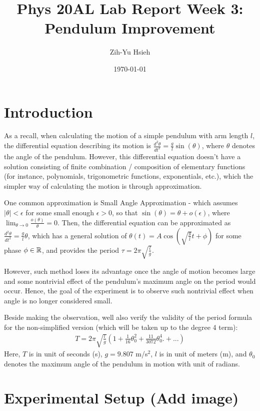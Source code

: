 \documentclass{article}
\title{Phys 20AL Lab Report Week 3: Pendulum Improvement}
\author{Zih-Yu Hsieh}
\date{\today}
\begin{document}
\maketitle

\tableofcontents

\newpage

\section{Introduction}
As a recall, when calculating the motion of a simple pendulum with arm length $l$, the differential equation describing its motion is $\frac{d^2\theta}{dt^2}=\frac{g}{l}\sin(\theta)$, where $\theta$ denotes the angle of the pendulum. However, this differential equation doesn't have a solution consisting of finite combination / composition of elementary functions (for instance, polynomials, trigonometric functions, exponentials, etc.), which the simpler way of calculating the motion is through approximation.

One common approximation is Small Angle Approximation - which assumes $|\theta|<\epsilon$ for some small enough $\epsilon>0$, so that $\sin(\theta) = \theta+o(\epsilon)$, where $\lim_{\theta\rightarrow 0}\frac{o(\theta)}{\theta}=0$. Then, the differential equation can be approximated as $\frac{d^2\theta}{dt^2}= \frac{g}{l}\theta$, which has a general solution of $\theta(t)=A\cos(\sqrt{\frac{g}{l}}t+\phi)$ for some phase $\phi\in\mathbb{R}$, and provides the period $\tau = 2\pi\sqrt{\frac{l}{g}}$.

However, such method loses its advantage once the angle of motion becomes large and some nontrivial effect of the pendulum's maximum angle on the period would occur. Hence, the goal of the experiment is to observe such nontrivial effect when angle is no longer considered small.

Beside making the observation, well also verify the validity of the period formula for the non-simplified version (which will be taken up to the degree 4 term):
\begin{align}
    T =2\pi\sqrt{\frac{l}{g}}\left(1+\frac{1}{16}\theta_0^2 + \frac{11}{3072}\theta_0^4.+ ...\right)
\end{align}\label{eq:nontriv}
Here, $T$ is in unit of seconds (s), $g=9.807$ m/s$ ^2$, $l$ is in unit of meters (m), and $\theta_0$ denotes the maximum angle of the pendulum in motion with unit of radians.

\hfil

\section{Experimental Setup (Add image)}
\end{document}
